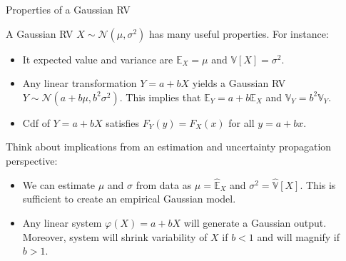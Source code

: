 \documentclass[handout,9pt]{beamer}
\begin{document}
%
\begin{frame}{Properties of a Gaussian RV}

A Gaussian RV $X\sim \mathcal{N}(\mu,\sigma^2)$ has many useful properties. For instance:
\begin{block}{}
\begin{itemize}
\setlength{\itemsep}{10pt}
\item It expected value and variance are $\mathbb{E}_X=\mu$ and $\mathbb{V}[X]=\sigma^2$. 
\item Any linear transformation $Y=a+bX$ yields a Gaussian RV $Y\sim \mathcal{N}(a+b\mu,b^2\sigma^2)$. This implies that $\mathbb{E}_Y=a+b\mathbb{E}_X$ and $\mathbb{V}_Y=b^2\mathbb{V}_Y$. 
\item Cdf of $Y=a+bX$ satisfies $F_Y(y)=F_X(x)$ for all $y=a+bx$. 
\end{itemize}
\end{block}
Think about implications from an estimation and uncertainty propagation perspective: 
\begin{block}{}
\begin{itemize}
\setlength{\itemsep}{10pt}
\item We can estimate  $\mu$ and $\sigma$ from data as $\mu =\hat{\mathbb{E}}_X$ and $\sigma^2=
\hat{\mathbb{V}}[X]$. This is sufficient to create an empirical Gaussian model. 
\item Any linear system $\varphi(X)=a+bX$ will generate a Gaussian output. Moreover, system will shrink variability of $X$ if $b<1$ and will magnify if $b>1$. 
\end{itemize}
\end{block}

\end{frame}
\end{document}
